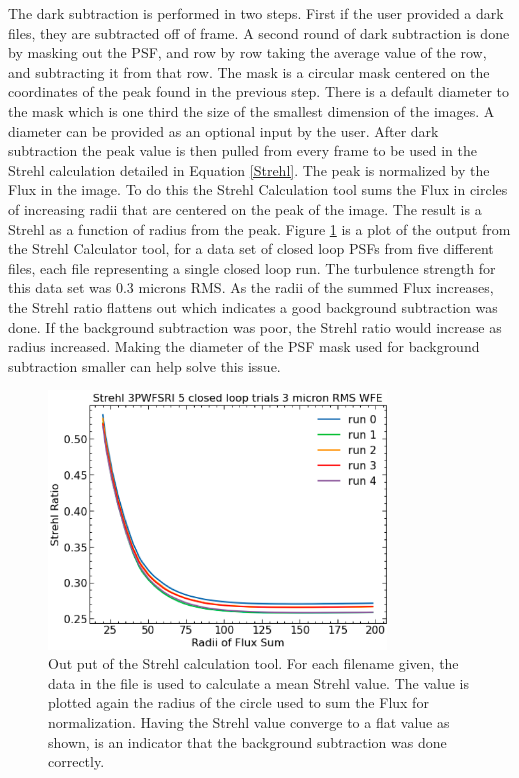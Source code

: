 The dark subtraction is performed in two steps. First if the user provided a dark files, they are subtracted off of frame. A second round of dark subtraction is done by masking out the PSF, and row by row taking the average value of the row, and subtracting it from that row. The mask is a circular mask centered on the coordinates of the peak found in the previous step. There is a default diameter to the mask which is one third the size of the smallest dimension of the images. A diameter can be provided as an optional input by the user. After dark subtraction the peak value is then pulled from every frame to be used in the Strehl calculation detailed in Equation \ref{Strehl}. The peak is normalized by the Flux in the image. To do this the Strehl Calculation tool sums the Flux in circles of increasing radii that are centered on the peak of the image. The result is a Strehl as a function of radius from the peak. Figure \ref{fig:StrehlVsRadiiExample} is a plot of the output from the Strehl Calculator tool, for a data set of closed loop PSFs from five different files, each file representing a single closed loop run. The turbulence strength for this data set was 0.3 microns RMS. As the radii of the summed Flux increases, the Strehl ratio flattens out which indicates a good background subtraction was done. If the background subtraction was poor, the Strehl ratio would increase as radius increased. Making the diameter of the PSF mask used for background subtraction smaller can help solve this issue. 

\begin{figure}
    \centering
    \includegraphics[width=0.8\textwidth]{Chapter Materials/Appendix Materials/StrehlVsRadiiExample.png}
    \caption{Out put of the Strehl calculation tool. For each filename given, the data in the file is used to calculate a mean Strehl value. The value is plotted again the radius of the circle used to sum the Flux for normalization. Having the Strehl value converge to a flat value as shown, is an indicator that the background subtraction was done correctly. }
    \label{fig:StrehlVsRadiiExample}
\end{figure}


